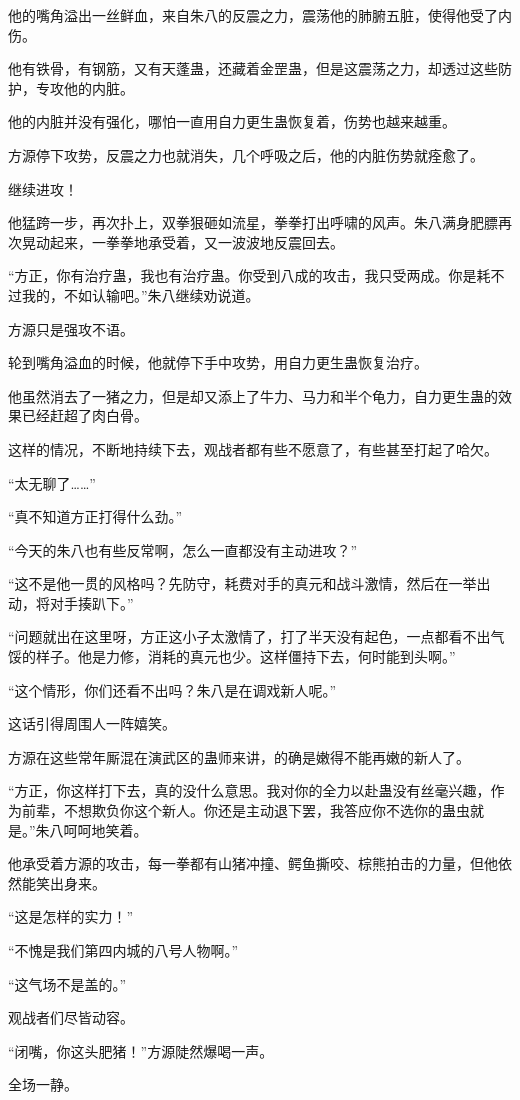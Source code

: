 \begin{this_body}
他的嘴角溢出一丝鲜血，来自朱八的反震之力，震荡他的肺腑五脏，使得他受了内伤。

他有铁骨，有钢筋，又有天蓬蛊，还藏着金罡蛊，但是这震荡之力，却透过这些防护，专攻他的内脏。

他的内脏并没有强化，哪怕一直用自力更生蛊恢复着，伤势也越来越重。

方源停下攻势，反震之力也就消失，几个呼吸之后，他的内脏伤势就痊愈了。

继续进攻！

他猛跨一步，再次扑上，双拳狠砸如流星，拳拳打出呼啸的风声。朱八满身肥膘再次晃动起来，一拳拳地承受着，又一波波地反震回去。

“方正，你有治疗蛊，我也有治疗蛊。你受到八成的攻击，我只受两成。你是耗不过我的，不如认输吧。”朱八继续劝说道。

方源只是强攻不语。

轮到嘴角溢血的时候，他就停下手中攻势，用自力更生蛊恢复治疗。

他虽然消去了一猪之力，但是却又添上了牛力、马力和半个龟力，自力更生蛊的效果已经赶超了肉白骨。

这样的情况，不断地持续下去，观战者都有些不愿意了，有些甚至打起了哈欠。

“太无聊了……”

“真不知道方正打得什么劲。”

“今天的朱八也有些反常啊，怎么一直都没有主动进攻？”

“这不是他一贯的风格吗？先防守，耗费对手的真元和战斗激情，然后在一举出动，将对手揍趴下。”

“问题就出在这里呀，方正这小子太激情了，打了半天没有起色，一点都看不出气馁的样子。他是力修，消耗的真元也少。这样僵持下去，何时能到头啊。”

“这个情形，你们还看不出吗？朱八是在调戏新人呢。”

这话引得周围人一阵嬉笑。

方源在这些常年厮混在演武区的蛊师来讲，的确是嫩得不能再嫩的新人了。

“方正，你这样打下去，真的没什么意思。我对你的全力以赴蛊没有丝毫兴趣，作为前辈，不想欺负你这个新人。你还是主动退下罢，我答应你不选你的蛊虫就是。”朱八呵呵地笑着。

他承受着方源的攻击，每一拳都有山猪冲撞、鳄鱼撕咬、棕熊拍击的力量，但他依然能笑出身来。

“这是怎样的实力！”

“不愧是我们第四内城的八号人物啊。”

“这气场不是盖的。”

观战者们尽皆动容。

“闭嘴，你这头肥猪！”方源陡然爆喝一声。

全场一静。

\end{this_body}

